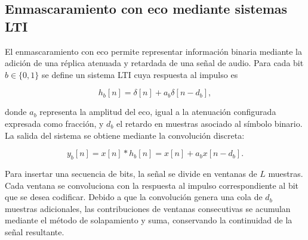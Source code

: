 \subsection{Enmascaramiento con eco mediante sistemas LTI}

El enmascaramiento con eco permite representar información
binaria mediante la adición de una réplica atenuada y retardada
de una señal de audio. Para cada bit $b\in\{0,1\}$ se define
un sistema LTI cuya
respuesta al impulso es

\begin{equation}
h_b[n]=\delta[n]+a_b\delta[n-d_b],
\end{equation}

donde $a_b$ representa la amplitud del eco, igual a la atenuación configurada
expresada como fracción, y $d_b$ el retardo en muestras asociado al símbolo
binario. La salida del sistema se obtiene mediante la convolución discreta:

\begin{equation}
y_b[n]=x[n]*h_b[n]
      =x[n]+a_b x[n-d_b].
\end{equation}

Para insertar una secuencia de bits, la señal se divide en
ventanas de $L$ muestras. Cada ventana se convoluciona
con la respuesta al impulso correspondiente al bit que
se desea codificar. Debido a que la convolución genera
una cola de $d_b$ muestras adicionales, las contribuciones
de ventanas consecutivas se acumulan mediante el método de
solapamiento y suma, conservando la continuidad de la señal
resultante.
